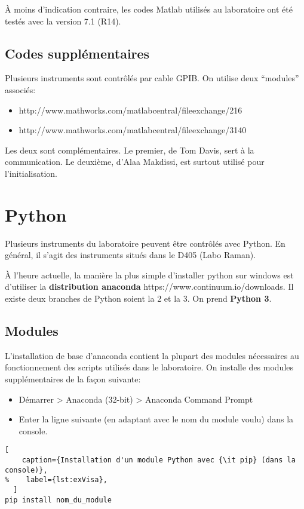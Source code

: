 \documentclass[11pt,francais]{book} %
\begin{document}
À moins d'indication contraire, les codes Matlab utilisés au laboratoire ont été testés avec la version 7.1 (R14).

\subsection{Codes supplémentaires}

Plusieurs instruments sont contrôlés par cable GPIB.
On utilise deux ``modules'' associés:
\begin{itemize}
\item http://www.mathworks.com/matlabcentral/fileexchange/216
\item http://www.mathworks.com/matlabcentral/fileexchange/3140
\label{tableModulesGPIBMatlab}
\end{itemize}
Les deux sont complémentaires.
Le premier, de Tom Davis, sert à la communication.
Le deuxième, d'Alaa Makdissi, est surtout utilisé pour l'initialisation.

\section{Python}

Plusieurs instruments du laboratoire peuvent être contrôlés avec Python.
En général, il s'agit des instruments situés dans le D405 (Labo Raman).

À l'heure actuelle, la manière la plus simple d'installer python sur windows est d'utiliser la {\bf distribution anaconda} https://www.continuum.io/downloads.
Il existe deux branches de Python soient la 2 et la 3. On prend {\bf Python 3}.

\subsection{Modules}

L'installation de base d'anaconda contient la plupart des modules nécessaires au fonctionnement des scripts utilisés dans le laboratoire.
On installe des modules supplémentaires de la fa\c{c}on suivante:
\begin{itemize}
\item Démarrer > Anaconda (32-bit) > Anaconda Command Prompt
 \item Enter la ligne suivante (en adaptant avec le nom du module voulu) dans la console.
\end{itemize}

\begin{lstlisting}[
    caption={Installation d'un module Python avec {\it pip} (dans la console)},
%    label={lst:exVisa},
  ]
pip install nom_du_module
\end{lstlisting}
\end{document}
